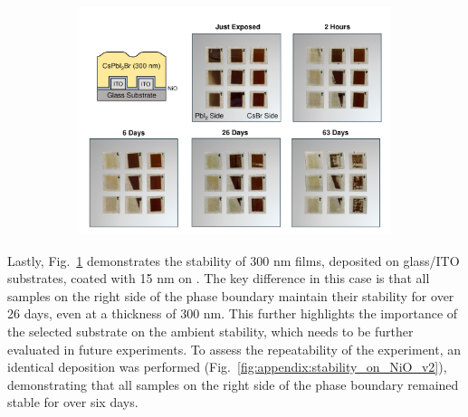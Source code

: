 \begin{figure}[htbp]
    \centering
    \begin{subfigure}[t]{0.99\textwidth}
        \centering
        \includegraphics[width=\textwidth]{chapters/stability/imeges/Stability_No_Rotation_275_on_nio.pdf} %
    \end{subfigure}

    \caption{}
    \label{fig:stability:no_rotation:300nm_ito_nio}
\end{figure}


Lastly, Fig.~\ref{fig:stability:no_rotation:300nm_ito_nio} demonstrates the stability of 300 nm  films, deposited on glass/ITO substrates, coated with 15 nm on . The key difference in this case is that all samples on the right side of the phase boundary maintain their stability for over 26 days, even at a thickness of 300 nm. This further highlights the importance of the selected substrate on the ambient stability, which needs to be further evaluated in future experiments. To assess the repeatability of the experiment, an identical deposition was performed (Fig.~\ref{fig:appendix:stability_on_NiO_v2}), demonstrating that all samples on the right side of the phase boundary remained stable for over six days. 


